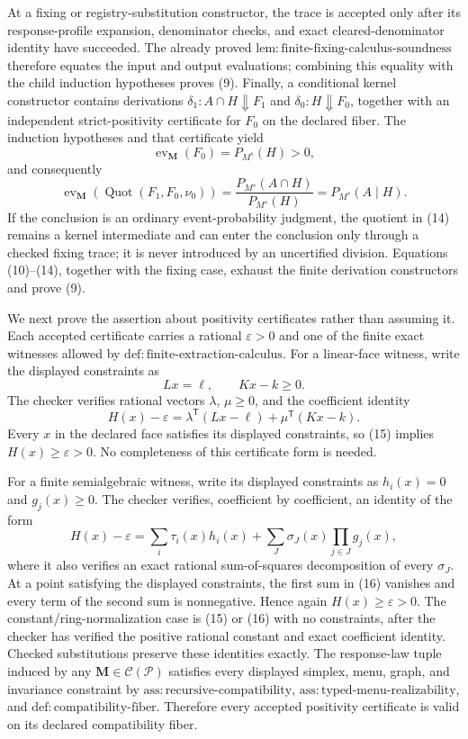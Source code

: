 At a fixing or registry-substitution constructor, the trace is accepted only
after its response-profile expansion, denominator checks, and exact
cleared-denominator identity have succeeded.  The already proved
\(\mathrm{lem:finite\text{-}fixing\text{-}calculus\text{-}soundness}\)
therefore equates the input and output evaluations; combining this equality
with the child induction hypotheses proves (9).  Finally, a conditional kernel
constructor contains derivations
\(\delta_1:A\cap H\Downarrow F_1\) and
\(\delta_0:H\Downarrow F_0\), together with an independent strict-positivity
certificate for \(F_0\) on the declared fiber.  The induction hypotheses and
that certificate yield
\[
 \operatorname{ev}_{\mathbf M}(F_0)=P_{M^s}(H)>0,
\]
and consequently
\[
 \operatorname{ev}_{\mathbf M}
 \!\left(\operatorname{Quot}(F_1,F_0,\nu_0)\right)
 =\frac{P_{M^s}(A\cap H)}{P_{M^s}(H)}
 =P_{M^s}(A\mid H).
 \tag{14}
\]
If the conclusion is an ordinary event-probability judgment, the quotient in
(14) remains a kernel intermediate and can enter the conclusion only through
a checked fixing trace; it is never introduced by an uncertified division.
Equations (10)--(14), together with the fixing case, exhaust the finite
derivation constructors and prove (9).

We next prove the assertion about positivity certificates rather than assuming
it.  Each accepted certificate carries a rational
\(\varepsilon>0\) and one of the finite exact witnesses allowed by
\(\mathrm{def:finite\text{-}extraction\text{-}calculus}\).  For a linear-face
witness, write the displayed constraints as
\[
 Lx=\ell,\qquad Kx-k\ge0.
\]
The checker verifies rational vectors \(\lambda\), \(\mu\ge0\), and the
coefficient identity
\[
 H(x)-\varepsilon
 =\lambda^{\mathsf T}(Lx-\ell)
  +\mu^{\mathsf T}(Kx-k).
 \tag{15}
\]
Every \(x\) in the declared face satisfies its displayed constraints, so
(15) implies \(H(x)\ge\varepsilon>0\).  No completeness of this certificate
form is needed.

For a finite semialgebraic witness, write its displayed constraints as
\(h_i(x)=0\) and \(g_j(x)\ge0\).  The checker verifies, coefficient by
coefficient, an identity of the form
\[
 H(x)-\varepsilon
 =\sum_i\tau_i(x)h_i(x)
  +\sum_{J}\sigma_J(x)\prod_{j\in J}g_j(x),
 \tag{16}
\]
where it also verifies an exact rational sum-of-squares decomposition of every
\(\sigma_J\).  At a point satisfying the displayed constraints, the first sum
in (16) vanishes and every term of the second sum is nonnegative.  Hence again
\(H(x)\ge\varepsilon>0\).  The constant/ring-normalization case is (15) or
(16) with no constraints, after the checker has verified the positive rational
constant and exact coefficient identity.  Checked substitutions preserve these
identities exactly.  The response-law tuple induced by any
\(\mathbf M\in\mathcal C(\mathcal P)\) satisfies every displayed simplex,
menu, graph, and invariance constraint by
\(\mathrm{ass:recursive\text{-}compatibility}\),
\(\mathrm{ass:typed\text{-}menu\text{-}realizability}\), and
\(\mathrm{def:compatibility\text{-}fiber}\).  Therefore every accepted
positivity certificate is valid on its declared compatibility fiber.


